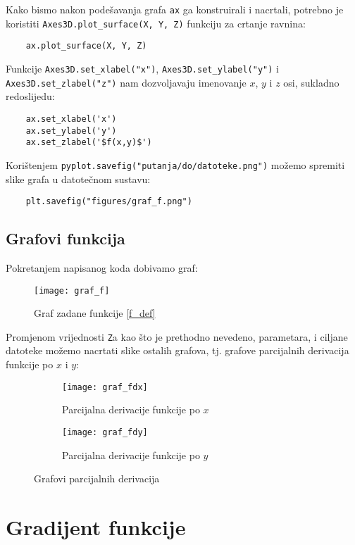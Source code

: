 Kako bismo nakon podešavanja grafa \verb|ax| ga konstruirali i nacrtali, potrebno je koristiti \verb|Axes3D.plot_surface(X, Y, Z)| funkciju za crtanje ravnina:
\begin{verbatim}
    ax.plot_surface(X, Y, Z)
\end{verbatim}

Funkcije \verb|Axes3D.set_xlabel("x")|, \verb|Axes3D.set_ylabel("y")| i \verb|Axes3D.set_zlabel("z")| nam dozvoljavaju imenovanje $x$, $y$ i $z$ osi, sukladno redoslijedu:
\begin{verbatim}
    ax.set_xlabel('x')
    ax.set_ylabel('y')
    ax.set_zlabel('$f(x,y)$')
\end{verbatim}

Korištenjem \verb|pyplot.savefig("putanja/do/datoteke.png")| možemo spremiti slike grafa u datotečnom sustavu:
\begin{verbatim}
    plt.savefig("figures/graf_f.png")
\end{verbatim}

\newpage

\subsection{Grafovi funkcija}

Pokretanjem napisanog koda dobivamo graf:
\begin{figure}[H]
    \centering
    \texttt{[image: graf\_f]}
    \caption{Graf zadane funkcije \eqref{f_def}}
\end{figure}

Promjenom vrijednosti \verb|Z|a kao što je prethodno nevedeno, parametara,
i ciljane datoteke možemo nacrtati slike ostalih grafova, tj. grafove parcijalnih derivacija funkcije po $x$ i $y$:
\begin{figure}[H]
    \begin{subfigure}{0.5\linewidth}
        \texttt{[image: graf\_fdx]}
        \caption{Parcijalna derivacije funkcije po $x$}
    \end{subfigure}%
    \begin{subfigure}{0.5\linewidth}
        \texttt{[image: graf\_fdy]}
        \caption{Parcijalna derivacije funkcije po $y$}
    \end{subfigure}
    \caption{Grafovi parcijalnih derivacija}
\end{figure}

\newpage
\section{Gradijent funkcije}

